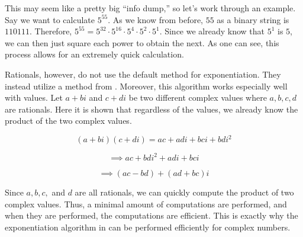 This may seem like a pretty big ``info dump,'' so let's work through an example.
Say we want to calculate $5^{55}$.
As we know from before, $55$ as a binary string is $110111$.
Therefore, $5^{55} = 5^{32} \cdot 5^{16} \cdot 5^4 \cdot 5^2 \cdot 5^1$.
Since we already know that $5^1$ is $5$, we can then just square each power to obtain the next.
As one can see, this process allows for an extremely quick calculation.

Rationals, however, do not use the default method for exponentiation.
They instead utilize a method from .
Moreover, this algorithm works especially well with  values.
Let $a+bi$ and $c+di$ be two different complex values where $a,b,c,d$ are rationals.
Here it is shown that regardless of the values, we already know the product of the two complex values.

\[
    (a+bi)(c+di) = ac+adi+bci+bdi^2
\]

\[
    \implies ac+bdi^2+adi+bci
\]

\[
    \implies (ac - bd) + (ad + bc)i
\]

Since $a,b,c,$ and $d$ are all rationals, we can quickly compute the product of two complex values.
Thus, a minimal amount of computations are performed, and when they are performed, the computations are efficient.
This is exactly why the exponentiation algorithm in  can be performed efficiently for complex numbers.
